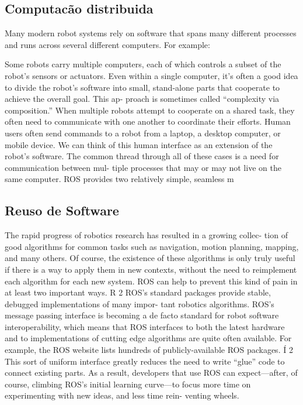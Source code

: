 \subsection{Computacão distribuida}
Many modern robot systems rely on software that spans many
different processes and runs across several different computers. For example:

Some robots carry multiple computers, each of which controls a subset of the robot’s
sensors or actuators.
Even within a single computer, it’s often a good idea to divide the robot’s software
into small, stand-alone parts that cooperate to achieve the overall goal. This ap-
proach is sometimes called “complexity via composition.”
When multiple robots attempt to cooperate on a shared task, they often need to
communicate with one another to coordinate their efforts.
Human users often send commands to a robot from a laptop, a desktop computer,
or mobile device. We can think of this human interface as an extension of the robot’s
software.
The common thread through all of these cases is a need for communication between mul-
tiple processes that may or may not live on the same computer. ROS provides two relatively
simple, seamless m

\subsection{Reuso de Software}
The rapid progress of robotics research has resulted in a growing collec-
tion of good algorithms for common tasks such as navigation, motion planning, mapping,
and many others. Of course, the existence of these algorithms is only truly useful if there is
a way to apply them in new contexts, without the need to reimplement each algorithm for
each new system. ROS can help to prevent this kind of pain in at least two important ways.
R
2
ROS’s standard packages provide stable, debugged implementations of many impor-
tant robotics algorithms.
ROS’s message passing interface is becoming a de facto standard for robot software
interoperability, which means that ROS interfaces to both the latest hardware and to
implementations of cutting edge algorithms are quite often available. For example,
the ROS website lists hundreds of publicly-available ROS packages. Í 2 This sort of
uniform interface greatly reduces the need to write “glue” code to connect existing
parts.
As a result, developers that use ROS can expect—after, of course, climbing ROS’s initial
learning curve—to focus more time on experimenting with new ideas, and less time rein-
venting wheels.

